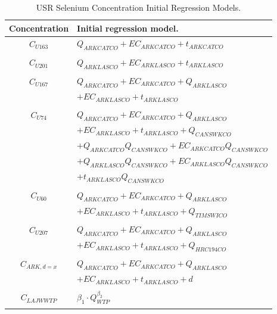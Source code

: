 \begin{table}[htbp]
\centering
\caption{USR Selenium Concentration Initial Regression Models.}
\label{tab:USRInitialRegression}
\begin{tabular}{c l}
	\toprule
	Concentration		& Initial regression model.\\
	\toprule
	$ C_{U163} $	& $Q_{ARKCATCO} + EC_{ARKCATCO} + t_{ARKCATCO}$\\
	\\
	$ C_{U201} $	& $Q_{ARKLASCO} + EC_{ARKLASCO} + t_{ARKLASCO}$\\
	\\	
	$ C_{U167} $ & $Q_{ARKCATCO} + EC_{ARKCATCO} + Q_{ARKLASCO}$\\
					& $+ EC_{ARKLASCO} + t_{ARKLASCO}$\\
	\\	
	$ C_{U74} $		& $Q_{ARKCATCO} + EC_{ARKCATCO} + Q_{ARKLASCO}$\\ 
					& $+ EC_{ARKLASCO} + t_{ARKLASCO} + Q_{CANSWKCO}$\\
					& $+ Q_{ARKCATCO}Q_{CANSWKCO} + EC_{ARKCATCO}Q_{CANSWKCO}$\\
					& $+ Q_{ARKLASCO}Q_{CANSWKCO} + EC_{ARKLASCO}Q_{CANSWKCO}$\\
					& $+ t_{ARKLASCO}Q_{CANSWKCO}$\\
	\\
	$ C_{U60} $	& $Q_{ARKCATCO} + EC_{ARKCATCO} + Q_{ARKLASCO}$\\
					& $+ EC_{ARKLASCO} + t_{ARKLASCO} + Q_{TIMSWICO}$\\
	\\
	$ C_{U207} $& $Q_{ARKCATCO} + EC_{ARKCATCO} + Q_{ARKLASCO}$\\
					& $+ EC_{ARKLASCO} + t_{ARKLASCO} + Q_{HRC194CO}$\\
	\\	
	$ C_{ARK,d=x} $	& $Q_{ARKCATCO} + EC_{ARKCATCO} + Q_{ARKLASCO}$\\
					& $+ EC_{ARKLASCO} + t_{ARKLASCO} + d$\\
	\\	
	$ C_{LAJWWTP} $	& $\beta_{1} \cdot Q_{WTP}^{\beta_{2}}$\\
	\bottomrule \\
\end{tabular}
\end{table}

